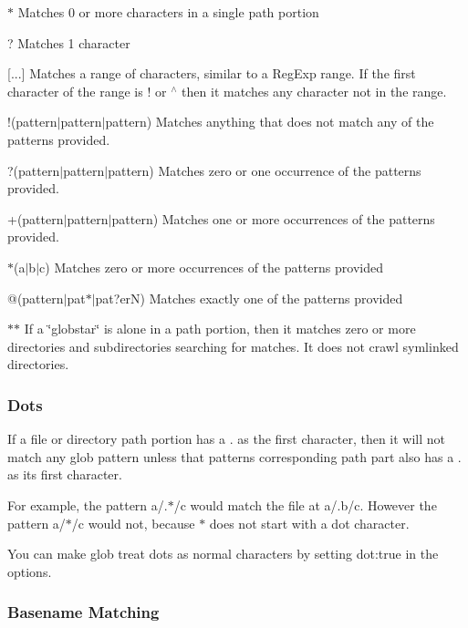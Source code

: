 \begin{DoxyItemize}
\item {\ttfamily $\ast$} Matches 0 or more characters in a single path portion
\item {\ttfamily ?} Matches 1 character
\item {\ttfamily \mbox{[}...\mbox{]}} Matches a range of characters, similar to a Reg\+Exp range. If the first character of the range is {\ttfamily !} or {\ttfamily $^\wedge$} then it matches any character not in the range.
\item {\ttfamily !(pattern$\vert$pattern$\vert$pattern)} Matches anything that does not match any of the patterns provided.
\item {\ttfamily ?(pattern$\vert$pattern$\vert$pattern)} Matches zero or one occurrence of the patterns provided.
\item {\ttfamily +(pattern$\vert$pattern$\vert$pattern)} Matches one or more occurrences of the patterns provided.
\item {\ttfamily $\ast$(a$\vert$b$\vert$c)} Matches zero or more occurrences of the patterns provided
\item {\ttfamily @(pattern$\vert$pat$\ast$$\vert$pat?erN)} Matches exactly one of the patterns provided
\item {\ttfamily $\ast$$\ast$} If a \char`\"{}globstar\char`\"{} is alone in a path portion, then it matches zero or more directories and subdirectories searching for matches. It does not crawl symlinked directories.
\end{DoxyItemize}

\subsubsection*{Dots}

If a file or directory path portion has a {\ttfamily .} as the first character, then it will not match any glob pattern unless that pattern\textquotesingle{}s corresponding path part also has a {\ttfamily .} as its first character.

For example, the pattern {\ttfamily a/.$\ast$/c} would match the file at {\ttfamily a/.b/c}. However the pattern {\ttfamily a/$\ast$/c} would not, because {\ttfamily $\ast$} does not start with a dot character.

You can make glob treat dots as normal characters by setting {\ttfamily dot\+:true} in the options.

\subsubsection*{Basename Matching}

